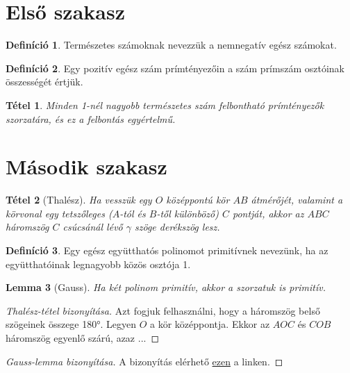 \documentclass{article}
\newtheorem{tetelek}{Tétel}
\newtheorem{lemmak}[tetelek]{Lemma}
\theoremstyle{definition}
\newtheorem{definiciok}{Definíció}[section]
\begin{document}
\section{Első szakasz}
\begin{definiciok}
Természetes számoknak nevezzük a nemnegatív egész számokat.
\end{definiciok}
\begin{definiciok}
Egy pozitív egész szám prímtényezőin a szám prímszám osztóinak összességét értjük.
\end{definiciok}
\begin{tetelek}
Minden 1-nél nagyobb természetes szám felbontható prímtényezők szorzatára, és ez a felbontás egyértelmű.
\end{tetelek}
\section{Második szakasz}
\begin{tetelek}[Thalész]
Ha vesszük egy $O$ középpontú kör $AB$ átmérőjét, valamint a körvonal egy tetszőleges ($A$-tól és $B$-től különböző) $C$ pontját, akkor az $ABC$ háromszög $C$ csúcsánál lévő $\gamma$ szöge derékszög lesz.
\end{tetelek}
\begin{definiciok}
Egy egész együtthatós polinomot primitívnek nevezünk, ha az együtthatóinak legnagyobb közös osztója 1.
\end{definiciok}
\begin{lemmak}[Gauss]
Ha két polinom primitív, akkor a szorzatuk is primitív.
\end{lemmak}
\begin{proof}[Thalész-tétel bizonyítása]
Azt fogjuk felhasználni, hogy a háromszög belső szögeinek összege 180°. Legyen $O$ a kör középpontja. Ekkor az $AOC$ és $COB$ háromszög egyenlő szárú, azaz ...
\end{proof}
\begin{proof}[Gauss-lemma bizonyítása]
A bizonyítás elérhető \href{https://hu.wikipedia.org/wiki/Gauss-lemma#A_lemma_bizonyítása}{ezen} a linken.
\end{proof}
\end{document}
